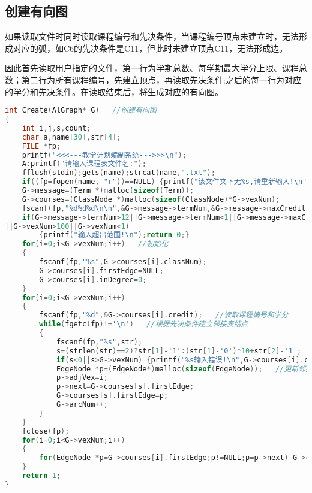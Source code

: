 \documentclass{DateStructure}
\begin{document}
\subsection{创建有向图}	
如果读取文件时同时读取课程编号和先决条件，当课程编号顶点未建立时，无法形成对应的弧，如C6的先决条件是C11，但此时未建立顶点C11，无法形成边。\par
因此首先读取用户指定的文件，第一行为学期总数、每学期最大学分上限、课程总数；第二行为所有课程编号，先建立顶点，再读取先决条件;之后的每一行为对应的学分和先决条件。在读取结束后，将生成对应的有向图。
\begin{lstlisting}[language=c,caption={Create}]
int Create(AlGraph* G)   //创建有向图
{
	int i,j,s,count;
	char a,name[30],str[4];
	FILE *fp;
	printf("<<<---教学计划编制系统--->>>\n");
	A:printf("请输入课程表文件名:");
	fflush(stdin);gets(name);strcat(name,".txt");
	if((fp=fopen(name, "r"))==NULL) {printf("该文件夹下无%s,请重新输入!\n",name);goto A;}
	G->message=(Term *)malloc(sizeof(Term));
	G->courses=(ClassNode *)malloc(sizeof(ClassNode)*G->vexNum);
	fscanf(fp,"%d%d%d\n\n",&G->message->termNum,&G->message->maxCredit,&G->vexNum);
	if(G->message->termNum>12||G->message->termNum<1||G->message->maxCredit<1
||G->vexNum>100||G->vexNum<1)
		{printf("输入超出范围!\n");return 0;}
	for(i=0;i<G->vexNum;i++)   //初始化
	{
		fscanf(fp,"%s",G->courses[i].classNum);
		G->courses[i].firstEdge=NULL;
		G->courses[i].inDegree=0;
	}
	for(i=0;i<G->vexNum;i++)
	{	
		fscanf(fp,"%d",&G->courses[i].credit);   //读取课程编号和学分
		while(fgetc(fp)!='\n')   //根据先决条件建立邻接表结点
		{
			fscanf(fp,"%s",str);
			s=(strlen(str)==2)?str[1]-'1':(str[1]-'0')*10+str[2]-'1';   //课程字符串转数字
			if(s<0||s>G->vexNum) {printf("%s输入错误!\n",G->courses[i].classNum);return 0;}
			EdgeNode *p=(EdgeNode*)malloc(sizeof(EdgeNode));   //更新邻接表结点
			p->adjVex=i;
			p->next=G->courses[s].firstEdge; 
			G->courses[s].firstEdge=p;
			G->arcNum++;
		}
	}
    fclose(fp);
	for(i=0;i<G->vexNum;i++)
	{
		for(EdgeNode *p=G->courses[i].firstEdge;p!=NULL;p=p->next) G->courses[p->adjVex].inDegree++;
	}
	return 1;
}
\end{lstlisting}
\end{document}
